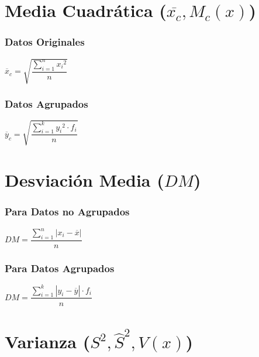 \documentclass[10pt,letterpaper]{article}
\begin{document}
\section{Media Cuadrática ($\overline{x_c},M_c(x)$)}
\begin{multicols}{2}
\subsubsection*{Datos Originales}
$\overline{x}_c=\sqrt{\dfrac{\displaystyle\sum_{i=1}^{n}{x_i}^2}{n}}$
\columnbreak
\subsubsection*{Datos Agrupados}
$\overline{y}_c=\sqrt{\dfrac{\displaystyle\sum_{i=1}^{k}{y_i}^2\cdot f_i}{n}}$
\end{multicols}

\section{Desviación Media ($DM$)}

\begin{multicols}{2}
\subsubsection*{Para Datos no Agrupados}
$DM=\dfrac{\displaystyle\sum_{i=1}^{n}|x_i-\overline{x}|}{n}$
\columnbreak
\subsubsection*{Para Datos Agrupados}
$DM=\dfrac{\displaystyle\sum_{i=1}^{k}|y_i-\overline{y}|\cdot f_i}{n}$
\end{multicols}


\section{Varianza ($S^2,\widehat{S}^2,V(x)$)}
\end{document}
